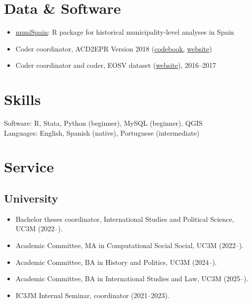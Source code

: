 \documentclass[a4paper, 12pt]{article}
\begin{document}
\section*{Data \& Software}

\begin{itemize}[leftmargin=*, nolistsep]
  \item \href{https://github.com/franvillamil/muniSpain}{muniSpain}: R package for historical municipality-level analyses in Spain
	\item Coder coordinator, ACD2EPR Version 2018 (\href{https://icr.ethz.ch/data/epr/acd2epr/ACD2EPR-2018_Codebook.pdf}{codebook,} \href{https://icr.ethz.ch/data/epr/acd2epr/}{website})
	\item Coder coordinator and coder, EOSV dataset (\href{https://snis.ch/project/civilian-victimization-conflict-escalation/}{website}), 2016--2017
\end{itemize}

\section*{Skills}

Software: R, Stata, Python (beginner), MySQL (beginner), QGIS\\
Languages: English, Spanish (native), Portuguese (intermediate)

\section*{Service}

\subsection*{University}

\begin{itemize}[leftmargin=*, nolistsep]
  \item Bachelor theses coordinator, International Studies and Political Science, UC3M (2022--).
	\item Academic Committee, MA in Computational Social Social, UC3M (2022--).
	\item Academic Committee, BA in History and Politics, UC3M (2024--).
	\item Academic Committee, BA in International Studies and Law, UC3M (2025--).
	\item IC3JM Internal Seminar, coordinator (2021--2023).
\end{itemize}
\end{document}
